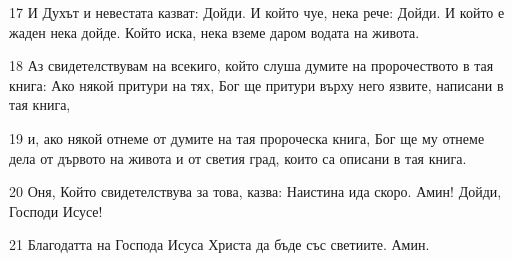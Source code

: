 \par 17 И Духът и невестата казват: Дойди. И който чуе, нека рече: Дойди. И който е жаден нека дойде. Който иска, нека вземе даром водата на живота.
\par 18 Аз свидетелствувам на всекиго, който слуша думите на пророчеството в тая книга: Ако някой притури на тях, Бог ще притури върху него язвите, написани в тая книга,
\par 19 и, ако някой отнеме от думите на тая пророческа книга, Бог ще му отнеме дела от дървото на живота и от светия град, които са описани в тая книга.
\par 20 Оня, Който свидетелствува за това, казва: Наистина ида скоро. Амин! Дойди, Господи Исусе!
\par 21 Благодатта на Господа Исуса Христа да бъде със светиите. Амин.

